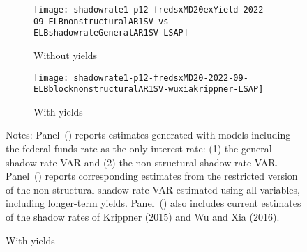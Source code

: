 \documentclass[12pt]{article}
\newcommand*{\legend}{Notes: } %
\newlength{\picwid}
\begin{document}
\clearpage
\begin{figure}[t]
	\caption{Shadow-rate estimates (posterior medians and 90\% bands).} 
	\setlength{\picwid}{.48\textwidth}
	\begin{center}
		\begin{subfigure}[b]{\picwid}
			\centering
			\texttt{[image: shadowrate1-p12-fredsxMD20exYield-2022-09-ELBnonstructuralAR1SV-vs-ELBshadowrateGeneralAR1SV-LSAP]}
			\caption{Without yields}\label{subfig:shadowrate:withoutyields}
		\end{subfigure}
		\begin{subfigure}[b]{\picwid}
			\centering
			\texttt{[image: shadowrate1-p12-fredsxMD20-2022-09-ELBblocknonstructuralAR1SV-wuxiakrippner-LSAP]}
			\caption{With yields}\label{subfig:shadowrate:withyields:wuxia}
		\end{subfigure}

	\end{center}

	\legend{Panel~() reports estimates generated with models including the federal funds rate as the only interest rate: (1) the general shadow-rate VAR and (2) the non-structural shadow-rate VAR.  Panel~() reports corresponding estimates from the restricted version of the non-structural shadow-rate VAR estimated using all variables, including longer-term yields. Panel~() also includes current estimates of the shadow rates of Krippner (2015) and Wu and Xia (2016).} \label{fig:shadowrates}
\end{figure}
\end{document}

